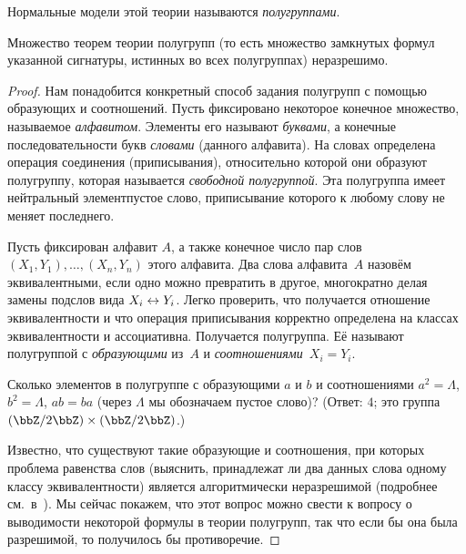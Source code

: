 Нормальные модели этой теории называются \emph{полугруппами}.%

\begin{theorem}
Множество теорем теории полугрупп (то есть множество замкнутых формул
указанной сигнатуры, истинных во всех полугруппах) неразрешимо.
\end{theorem}


\begin{proof}
Нам понадобится конкретный способ задания полугрупп с помощью
образующих и соотношений. Пусть фиксировано некоторое конечное
множество, называемое \emph{алфавитом}.%
Элементы его называют
\emph{буквами},%
а конечные последовательности букв\т
\emph{словами}%
(данного алфавита). На словах определена операция
соединения (приписывания), относительно которой они образуют
полугруппу, которая называется \emph{свободной полугруппой}.%
%
Эта полугруппа имеет нейтральный элемент\т пустое слово,
приписывание которого к любому слову не меняет последнего.

Пусть фиксирован алфавит $A$, а также конечное число
пар слов $(X_1, Y_1),\dots,(X_n,Y_n)$
этого алфавита. Два слова алфавита~$A$ назовём
эквивалентными, если одно можно превратить в другое, многократно
делая замены подслов вида $X_i\hm\leftrightarrow Y_i$. Легко
проверить, что получается отношение эквивалентности и что
операция приписывания корректно определена на классах
эквивалентности и ассоциативна. Получается полугруппа. Её
называют полугруппой с \emph{образующими} из~$A$ и
\emph{соотношениями}~$X_i=Y_i$.%
%
%

        \begin{problem}
Сколько элементов в полугруппе с образующими $a$ и $b$ и
соотношениями $a^2=\Lambda$, $b^2=\Lambda$, $ab=ba$ (через
$\Lambda$ мы обозначаем пустое слово)? (Ответ: $4$; это группа
$(\bbZ/2\bbZ)\times(\bbZ/2\bbZ)$.)
        \end{problem}

Известно, что существуют такие образующие и соотношения, при
которых проблема равенства слов (выяснить, принадлежат ли два
данных слова одному классу эквивалентности) является
алгоритмически неразрешимой (подробнее
см.~в~\cite{computable-functions}). Мы сейчас покажем, что этот
вопрос можно свести к вопросу о выводимости некоторой формулы в
теории полугрупп, так что если бы она была разрешимой, то
получилось бы противоречие.


\end{proof}
